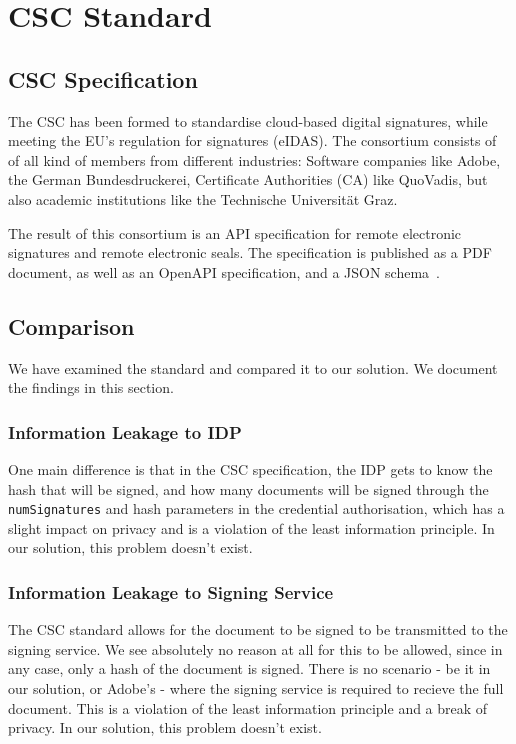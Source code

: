 \chapter{CSC Standard}\label{ch:cscstandard}

\section{CSC Specification}\label{sec:csc-specification}

The \acrfull{CSC} has been formed to standardise cloud-based digital signatures, while meeting the \gls{EU}'s regulation for signatures (\gls{eIDAS}).
The consortium consists of of all kind of members from different industries: Software companies like Adobe,
the German Bundesdruckerei, Certificate Authorities (\gls{CA}) like QuoVadis,
but also academic institutions like the Technische Universit\"at Graz.

The result of this consortium is an \gls{API} specification for remote electronic signatures and remote electronic seals.
The specification is published as a \gls{PDF} document, as well as an \gls{OpenAPI} specification, and a \gls{JSON} schema~\cite{csc-spec}.


\section{Comparison}\label{subsec:comparison}
We have examined the standard and compared it to our solution.
We document the findings in this section.

\subsection{Information Leakage to IDP}

One main difference is that in the \gls{CSC} specification,
the \gls{IDP} gets to know the hash that will be signed,
and how many documents will be signed through the \texttt{numSignatures} and hash parameters in the credential authorisation,
which has a slight impact on privacy and is a violation of the least information principle.
In our solution, this problem doesn't exist.

\subsection{Information Leakage to Signing Service}
The \gls{CSC} standard allows for the document to be signed to be transmitted to the signing service.
We see absolutely no reason at all for this to be allowed,
since in any case,
only a hash of the document is signed.
There is no scenario - be it in our solution, or Adobe's - where the signing service is required to recieve the full document.
This is a violation of the least information principle and a break of privacy.
In our solution, this problem doesn't exist.

